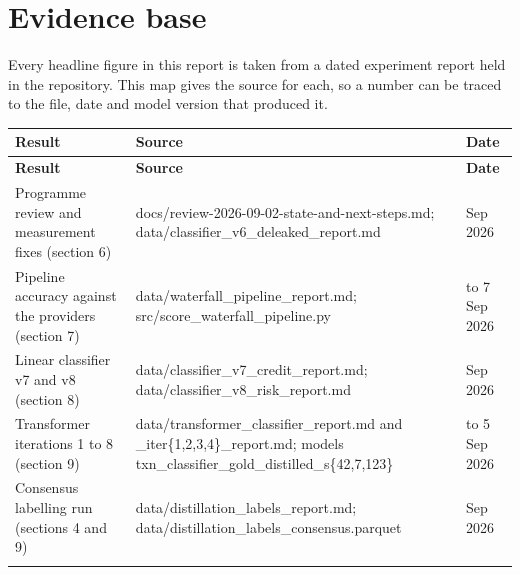 \section{Evidence base}
Every headline figure in this report is taken from a dated experiment report held in the repository. This map gives the source for each, so a number can be traced to the file, date and model version that produced it.

{\small
\setlength{\TableWidth}{\dimexpr\linewidth-6\tabcolsep\relax}
\begin{longtable}{>{\raggedright\arraybackslash}p{0.27\TableWidth}>{\raggedright\arraybackslash}p{0.57\TableWidth}>{\raggedright\arraybackslash}p{0.16\TableWidth}}
\rowcolor{BlueTint}
\bfseries Result & \bfseries Source & \bfseries Date \\ \midrule
\endfirsthead
\rowcolor{BlueTint}
\bfseries Result & \bfseries Source & \bfseries Date \\ \midrule
\endhead
Programme review and measurement fixes (section 6) & {\scriptsize\ttfamily docs/\allowbreak{}review-2026-09-02-state-and-next-steps.md}; {\scriptsize\ttfamily data/\allowbreak{}classifier\_\allowbreak{}v6\_\allowbreak{}deleaked\_\allowbreak{}report.md} & 2 Sep 2026 \\ \addlinespace[4pt]
Pipeline accuracy against the providers (section 7) & {\scriptsize\ttfamily data/\allowbreak{}waterfall\_\allowbreak{}pipeline\_\allowbreak{}report.md}; {\scriptsize\ttfamily src/\allowbreak{}score\_\allowbreak{}waterfall\_\allowbreak{}pipeline.py} & 2 to 7 Sep 2026 \\ \addlinespace[4pt]
Linear classifier v7 and v8 (section 8) & {\scriptsize\ttfamily data/\allowbreak{}classifier\_\allowbreak{}v7\_\allowbreak{}credit\_\allowbreak{}report.md}; {\scriptsize\ttfamily data/\allowbreak{}classifier\_\allowbreak{}v8\_\allowbreak{}risk\_\allowbreak{}report.md} & 3 Sep 2026 \\ \addlinespace[4pt]
Transformer iterations 1 to 8 (section 9) & {\scriptsize\ttfamily data/\allowbreak{}transformer\_\allowbreak{}classifier\_\allowbreak{}report.md} and {\scriptsize\ttfamily \_\allowbreak{}iter\{1,2,3,4\}\_\allowbreak{}report.md}; models {\scriptsize\ttfamily txn\_\allowbreak{}classifier\_\allowbreak{}gold\_\allowbreak{}distilled\_\allowbreak{}s\{42,7,123\}} & 2 to 5 Sep 2026 \\ \addlinespace[4pt]
Consensus labelling run (sections 4 and 9) & {\scriptsize\ttfamily data/\allowbreak{}distillation\_\allowbreak{}labels\_\allowbreak{}report.md}; {\scriptsize\ttfamily data/\allowbreak{}distillation\_\allowbreak{}labels\_\allowbreak{}consensus.parquet} & 5 Sep 2026 \\ \addlinespace[4pt]

\end{longtable}}
